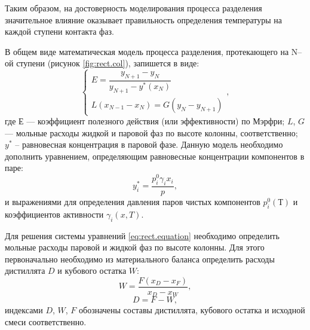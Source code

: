 Таким образом, на достоверность моделирования процесса разделения значительное влияние оказывает правильность определения температуры на каждой ступени контакта фаз.

В общем виде математическая модель процесса разделения, протекающего на N--ой ступени (рисунок \ref{fig:rect.col}), запишется в виде:
\begin{equation} \label{eq:rect.equation}
\left\lbrace 
\begin{gathered} 
E=\dfrac{y_{N+1}-y_{N}}{y_{N+1}-y^*(x_N)}\\
L(x_{N-1}-x_N)=G(y_N-y_{N+1})
\end{gathered} 
\right. ,
\end{equation}
где $Е$ --- коэффициент полезного действия (или эффективности) по Мэрфри; $L$, $G$ --- мольные расходы жидкой и паровой фаз по высоте колонны, соответственно; $y^*$ – равновесная концентрация в паровой фазе. Данную модель необходимо дополнить уравнением, определяющим равновесные концентрации компонентов в паре:
\begin{equation}
	y_i^*=\dfrac{p_i^0 \gamma_i x_i}{p},
\end{equation}
и выражениями для определения давления паров чистых компонентов $p_i^0(Т)$ и коэффициентов активности $\gamma_i(x,T)$.

Для решения системы уравнений \eqref{eq:rect.equation} необходимо определить мольные расходы паровой и жидкой фаз по высоте колонны. Для этого первоначально необходимо из материального баланса определить расходы дистиллята $D$ и кубового остатка $W$:
\begin{equation}
	W = \dfrac{F (x_D - x_F)}{x_D - x_W},
\end{equation}
\begin{equation}
	D = F - W,
\end{equation}
индексами $D$, $W$, $F$ обозначены составы дистиллята, кубового остатка и исходной смеси соответственно. 

